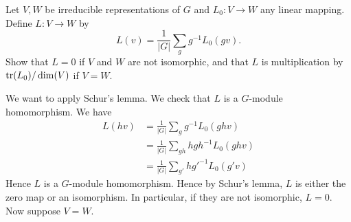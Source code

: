 \documentclass[11pt, english]{article}
\begin{document}
\begin{exc}[Exercise 2.34]
Let $V,W$ be irreducible representations of $G$ and $L_0:V \to W$ any linear mapping. Define $L:V \to W$ by 
$$
L(v) = \frac{1}{\lvert G \rvert} \sum_g g^{-1} L_0(gv).
$$
Show that $L=0$ if $V$ and $W$ are not isomorphic, and that $L$ is multiplication by $\operatorname{tr}(L_0)/\dim (V)$ if $V=W$.
\end{exc}
\begin{sol}
We want to apply Schur's lemma. We check that $L$ is a $G$-module homomorphism. We have
\begin{align*}
L(hv) &= \frac{1}{\lvert G \rvert} \sum_g g^{-1}L_0(ghv) \\
&= \frac{1}{\lvert G\rvert} \sum_{gh} h {gh}^{-1}L_0(ghv) \\
&= \frac{1}{\lvert G\rvert} \sum_{g'} h {g'}^{-1}L_0(g'v)
\end{align*}
Hence $L$ is a $G$-module homomorphism. Hence by Schur's lemma, $L$ is either the zero map or an isomorphism. In particular, if they are not isomorphic, $L=0$. Now suppose $V=W$. 
\end{sol}
\end{document}
